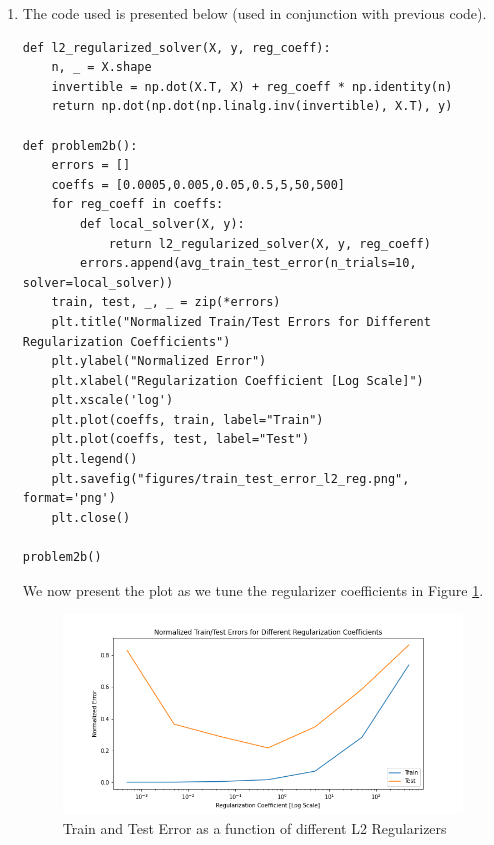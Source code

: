 \documentclass[12pt]{article}
\begin{document}
\begin{enumerate}[label=(\alph*)]
\begin{verbatim}
problem2a()
    \end{verbatim}
    Average normalized train error: 0.0000 compared to true train error: 0.0517
    
    Average normalized test error: 1.2890 compared to true test error: 0.0495

  \item
    The code used is presented below (used in conjunction with previous code).
    \begin{verbatim}
def l2_regularized_solver(X, y, reg_coeff):
    n, _ = X.shape
    invertible = np.dot(X.T, X) + reg_coeff * np.identity(n)
    return np.dot(np.dot(np.linalg.inv(invertible), X.T), y)

def problem2b():
    errors = []
    coeffs = [0.0005,0.005,0.05,0.5,5,50,500]
    for reg_coeff in coeffs:
        def local_solver(X, y):
            return l2_regularized_solver(X, y, reg_coeff)
        errors.append(avg_train_test_error(n_trials=10, solver=local_solver))
    train, test, _, _ = zip(*errors)
    plt.title("Normalized Train/Test Errors for Different Regularization Coefficients")
    plt.ylabel("Normalized Error")
    plt.xlabel("Regularization Coefficient [Log Scale]")
    plt.xscale('log')
    plt.plot(coeffs, train, label="Train")
    plt.plot(coeffs, test, label="Test")
    plt.legend()
    plt.savefig("figures/train_test_error_l2_reg.png", format='png')
    plt.close()

problem2b()
    \end{verbatim}
    We now present the plot as we tune the regularizer coefficients in Figure \ref{fig:train_test_error_l2}.
    \begin{figure}[!ht]
      \centering
      \includegraphics[scale=0.5]{figures/train_test_error_l2_reg.png}
      \caption{Train and Test Error as a function of different L2 Regularizers}
      \label{fig:train_test_error_l2}
    \end{figure}


\end{enumerate}
\end{document}
